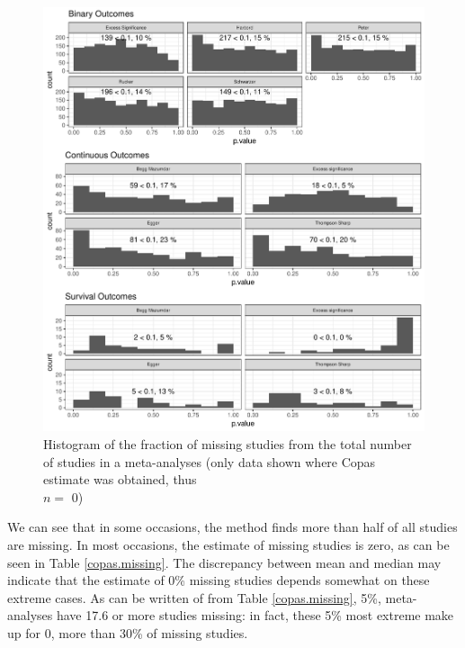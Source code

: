 \begin{figure}
\begin{knitrout}
\color{fgcolor}

{\centering \includegraphics[width=\textwidth-3cm]{figure/ch03_figunnamed-chunk-10-1} 

}



\end{knitrout}
\caption{Histogram of the fraction of missing studies from the total number of studies in a meta-analyses (only data shown where Copas estimate was obtained, thus \\$n =$ 0)}
\label{fig:copas.missing}
\end{figure}

We can see that in some occasions, the method finds more than half of all studies are missing. In most occasions, the estimate of missing studies is zero, as can be seen in Table \ref{copas.missing}. The discrepancy between mean and median may indicate that the estimate of 0\% missing studies depends somewhat on these extreme cases. As can be written of from Table \ref{copas.missing}, 5\%,  meta-analyses have 17.6 or more studies missing: in fact, these 5\% most extreme make up for 0, more than 30\% of missing studies.

